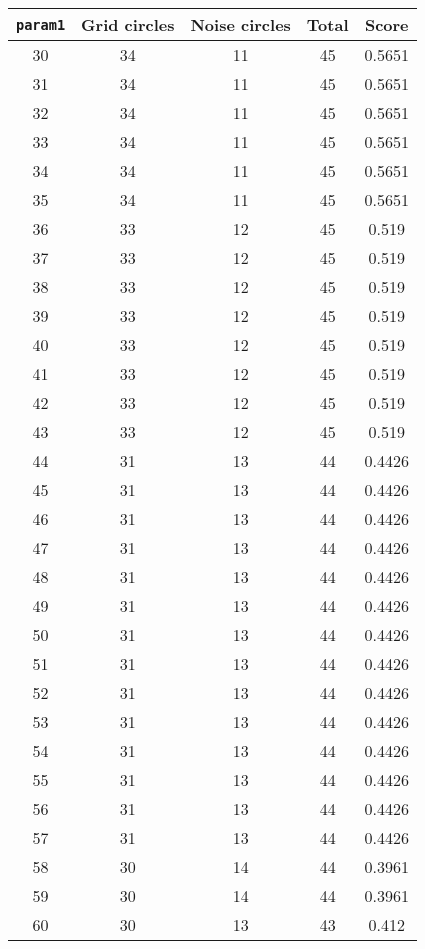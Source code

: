 \documentclass[letterpaper, 12pt]{article}
\begin{document}
\begin{longtable}{|c|c|c|c|c|}
\hline
\textbf{\texttt{param1}} & \textbf{Grid circles} & \textbf{Noise circles} & \textbf{Total} & \textbf{Score} \\
\hline
30 & 34 & 11 & 45 & 0.5651 \\
\hline
31 & 34 & 11 & 45 & 0.5651 \\
\hline
32 & 34 & 11 & 45 & 0.5651 \\
\hline
33 & 34 & 11 & 45 & 0.5651 \\
\hline
34 & 34 & 11 & 45 & 0.5651 \\
\hline
35 & 34 & 11 & 45 & 0.5651 \\
\hline
36 & 33 & 12 & 45 & 0.519 \\
\hline
37 & 33 & 12 & 45 & 0.519 \\
\hline
38 & 33 & 12 & 45 & 0.519 \\
\hline
39 & 33 & 12 & 45 & 0.519 \\
\hline
40 & 33 & 12 & 45 & 0.519 \\
\hline
41 & 33 & 12 & 45 & 0.519 \\
\hline
42 & 33 & 12 & 45 & 0.519 \\
\hline
43 & 33 & 12 & 45 & 0.519 \\
\hline
44 & 31 & 13 & 44 & 0.4426 \\
\hline
45 & 31 & 13 & 44 & 0.4426 \\
\hline
46 & 31 & 13 & 44 & 0.4426 \\
\hline
47 & 31 & 13 & 44 & 0.4426 \\
\hline
48 & 31 & 13 & 44 & 0.4426 \\
\hline
49 & 31 & 13 & 44 & 0.4426 \\
\hline
50 & 31 & 13 & 44 & 0.4426 \\
\hline
51 & 31 & 13 & 44 & 0.4426 \\
\hline
52 & 31 & 13 & 44 & 0.4426 \\
\hline
53 & 31 & 13 & 44 & 0.4426 \\
\hline
54 & 31 & 13 & 44 & 0.4426 \\
\hline
55 & 31 & 13 & 44 & 0.4426 \\
\hline
56 & 31 & 13 & 44 & 0.4426 \\
\hline
57 & 31 & 13 & 44 & 0.4426 \\
\hline
58 & 30 & 14 & 44 & 0.3961 \\
\hline
59 & 30 & 14 & 44 & 0.3961 \\
\hline
60 & 30 & 13 & 43 & 0.412 \\

\end{longtable}
\end{document}
